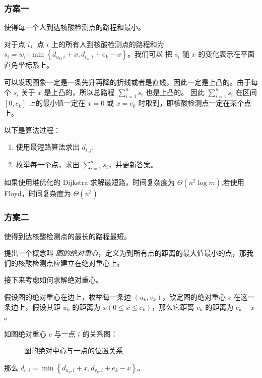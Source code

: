 \documentclass{cumcmthesis}
\begin{document}
\subsubsection{方案一}

使得每一个人到达核酸检测点的路程和最小。

对于点 $i$，点 $i$ 上的所有人到核酸检测点的路程和为 $s_i=w_i\cdot\min\left\{d_{u_k,i}+x,d_{v_k,i}+e_k-x\right\}$。我们可以
把 $s_i$ 随 $x$ 的变化表示在平面直角坐标系上。


可以发现图象一定是一条先升再降的折线或者是直线，因此一定是上凸的。由于每个 $s_i$ 关于 $x$ 是上凸的，所以总路程 $\sum_{i=1}^n s_i$ 也是上凸的。
因此 $\sum_{i=1}^n s_i$ 在区间 $[0,e_k]$ 上的最小值一定在 $x=0$ 或 $x=e_k$ 时取到，即核酸检测点一定在某个点上。

以下是算法过程：

\begin{enumerate}
    \item 使用最短路算法求出 $d_{i,j}$;
    \item 枚举每一个点，求出 $\sum_{i=1}^n s_i$，并更新答案。
\end{enumerate}

如果使用堆优化的 Dijkstra 求解最短路，时间复杂度为 $\Theta(n^2\log m)$,若使用 Floyd，时间复杂度为 $\Theta(n^3)$

\subsubsection{方案二}

使得到达核酸检测点的最长的路程最短。

提出一个概念叫 \emph{图的绝对重心}，定义为到所有点的距离的最大值最小的点，那我们的核酸检测点应建立在绝对重心上。

接下来考虑如何求解绝对重心。

假设图的绝对重心在边上，枚举每一条边 $(u_k,v_k)$，钦定图的绝对重心 $c$ 在这一条边上，假设其距 $u_k$ 的距离为 $x(0 \le x \le e_k)$，那么它距离 $v_k$ 的距离为 $e_k - x$。

如图绝对重心 $c$ 与一点 $i$ 的关系图：

\begin{figure}[H]
    \centering
    
    \caption{图的绝对中心与一点的位置关系\cite{oiwiki-dmst}}
    \label{fig:Single-1}
\end{figure}

那么 $d_{c,i} = \min\left\{d_{u_k, i} + x, d_{v_k,i} + e_k - x\right\}$。
\end{document}
